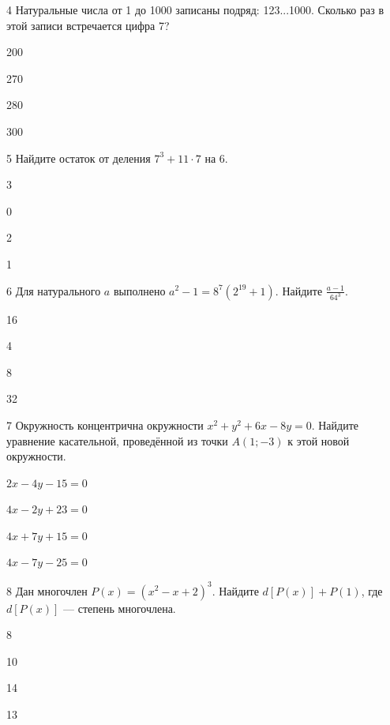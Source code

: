 \documentclass[14pt]{article}
\begin{document}
\begin{questionbox}{4}
    Натуральные числа от 1 до 1000 записаны подряд: 123...1000. Сколько раз в этой записи встречается цифра 7?
    \begin{options}
        \item 200
        \item 270
        \item 280
        \item 300
    \end{options}
\end{questionbox}

\begin{questionbox}{5}
    Найдите остаток от деления \(7^3 + 11 \cdot 7\) на 6.
    \begin{options}
        \item 3
        \item 0
        \item 2
        \item 1
    \end{options}
\end{questionbox}

\begin{questionbox}{6}
    Для натурального \(a\) выполнено \(a^2 - 1 = 8^7 (2^{19} + 1)\). Найдите \(\frac{a-1}{64^3}\).
    \begin{options}
        \item 16
        \item 4
        \item 8
        \item 32
    \end{options}
\end{questionbox}

\begin{questionbox}{7}
    Окружность концентрична окружности \(x^2 + y^2 + 6x - 8y = 0\). Найдите уравнение касательной, проведённой из точки \(A(1; -3)\) к этой новой окружности.
    \begin{options}
        \item \(2x - 4y - 15 = 0\)
        \item \(4x - 2y + 23 = 0\)
        \item \(4x + 7y + 15 = 0\)
        \item \(4x - 7y - 25 = 0\)
    \end{options}
\end{questionbox}

\begin{questionbox}{8}
    Дан многочлен \(P(x) = (x^2 - x + 2)^3\). Найдите \(d[P(x)] + P(1)\), где \(d[P(x)]\) — степень многочлена.
    \begin{options}
        \item 8
        \item 10
        \item 14
        \item 13
    \end{options}
\end{questionbox}
\end{document}
